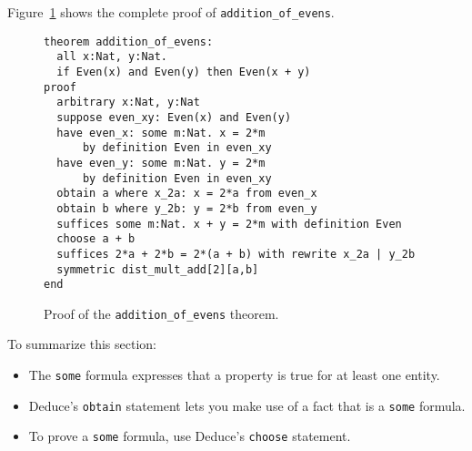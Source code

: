 \documentclass[12pt]{article}
\begin{document}
\noindent Figure~\ref{fig:add-evens} shows the complete proof of
\texttt{addition\_of\_evens}.

\begin{figure}[tbp]
\begin{verbatim}
theorem addition_of_evens:
  all x:Nat, y:Nat.
  if Even(x) and Even(y) then Even(x + y)
proof
  arbitrary x:Nat, y:Nat
  suppose even_xy: Even(x) and Even(y)
  have even_x: some m:Nat. x = 2*m
      by definition Even in even_xy
  have even_y: some m:Nat. y = 2*m
      by definition Even in even_xy
  obtain a where x_2a: x = 2*a from even_x
  obtain b where y_2b: y = 2*b from even_y
  suffices some m:Nat. x + y = 2*m with definition Even
  choose a + b
  suffices 2*a + 2*b = 2*(a + b) with rewrite x_2a | y_2b
  symmetric dist_mult_add[2][a,b]
end
\end{verbatim}
\caption{Proof of the \texttt{addition\_of\_evens} theorem.}
\label{fig:add-evens}
\end{figure}

To summarize this section:
\begin{itemize}
\item The \texttt{some} formula expresses that a property is true for
  at least one entity.
\item Deduce's \texttt{obtain} statement lets you make
  use of a fact that is a \texttt{some} formula.
\item To prove a \texttt{some} formula, use Deduce's \texttt{choose}
  statement.
\end{itemize}
\end{document}

